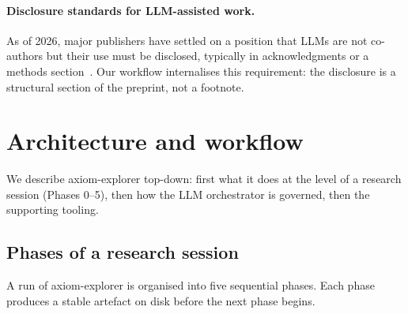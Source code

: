 \documentclass[11pt]{article}
\theoremstyle{definition}
\theoremstyle{remark}
\begin{document}
\paragraph{Disclosure standards for LLM-assisted work.} As of 2026,
major publishers have settled on a position that LLMs are not
co-authors but their use must be disclosed, typically in
acknowledgments or a methods section~\cite{Nature2023LLMPolicy,
ICMJE2023AIGuidance}. Our workflow internalises this requirement: the
disclosure is a structural section of the preprint, not a footnote.

\section{Architecture and workflow}\label{sec:workflow}

We describe axiom-explorer top-down: first what it does at the level of
a research session (Phases 0--5), then how the LLM orchestrator is
governed, then the supporting tooling.

\subsection{Phases of a research session}

A run of axiom-explorer is organised into five sequential phases. Each
phase produces a stable artefact on disk before the next phase begins.
\end{document}

